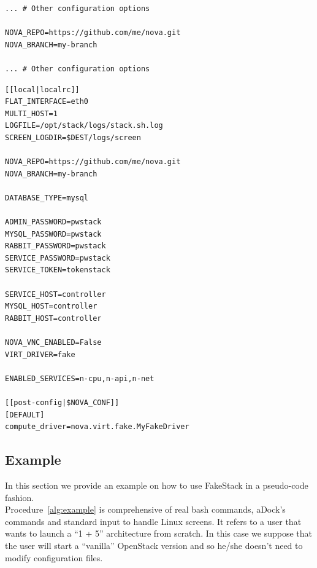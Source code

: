 \begin{lstlisting}[floatplacement=H, caption={Change repository URL}, label={lst:change_repo}, numbers=none]
... # Other configuration options

NOVA_REPO=https://github.com/me/nova.git
NOVA_BRANCH=my-branch

... # Other configuration options
\end{lstlisting}

\begin{lstlisting}[floatplacement=H, caption={Complete \texttt{local.conf} example for compute node}, label={lst:localconf_ex}]
[[local|localrc]]
FLAT_INTERFACE=eth0
MULTI_HOST=1
LOGFILE=/opt/stack/logs/stack.sh.log
SCREEN_LOGDIR=$DEST/logs/screen

NOVA_REPO=https://github.com/me/nova.git
NOVA_BRANCH=my-branch

DATABASE_TYPE=mysql

ADMIN_PASSWORD=pwstack
MYSQL_PASSWORD=pwstack
RABBIT_PASSWORD=pwstack
SERVICE_PASSWORD=pwstack
SERVICE_TOKEN=tokenstack

SERVICE_HOST=controller
MYSQL_HOST=controller
RABBIT_HOST=controller

NOVA_VNC_ENABLED=False
VIRT_DRIVER=fake

ENABLED_SERVICES=n-cpu,n-api,n-net

[[post-config|$NOVA_CONF]]
[DEFAULT]
compute_driver=nova.virt.fake.MyFakeDriver
\end{lstlisting}

\subsection{Example}
\label{sub:fakestack_ex}
In this section we provide an example on how to use FakeStack in a pseudo-code fashion.\\
Procedure~\ref{alg:example} is comprehensive of real bash commands, aDock's commands and standard input to handle Linux screens. It refers to a user that wants to launch a ``1 + 5'' architecture from scratch. In this case we suppose that the user will start a ``vanilla'' OpenStack version and so he/she doesn't need to modify configuration files.

